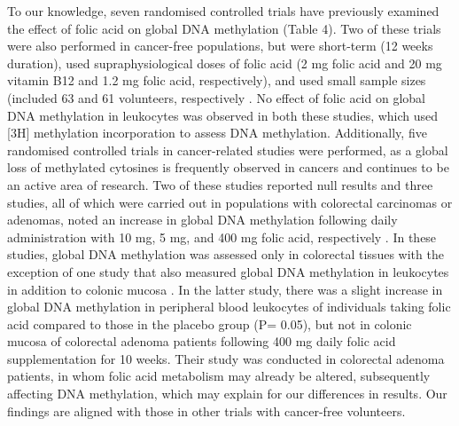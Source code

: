\noindent To our knowledge, seven randomised controlled trials have previously examined the effect of folic acid on global DNA methylation (Table 4). Two of these trials were also performed in cancer-free populations, but were short-term (12 weeks duration), used supraphysiological doses of folic acid (2 mg folic acid and 20 mg vitamin B12 and 1.2 mg folic acid, respectively), and used small sample sizes (included 63 and 61 volunteers, respectively \cite{c434,c435}. No effect of folic acid on global DNA methylation in leukocytes was observed in both these studies, which used [3H] methylation incorporation to assess DNA methylation. Additionally, five randomised controlled trials in cancer-related studies were performed, as a global loss of methylated cytosines is frequently observed in cancers \cite{c436} and continues to be an active area of research. Two of these studies reported null results \cite{c437,c438} and three studies, all of which were carried out in populations with colorectal carcinomas or adenomas, noted an increase in global DNA methylation following daily administration with 10 mg, 5 mg, and 400 mg folic acid, respectively \cite{c439,c441}. In these studies, global DNA methylation was assessed only in colorectal tissues with the exception of one study that also measured global DNA methylation in leukocytes in addition to colonic mucosa \cite{c441}. In the latter study, there was a slight increase in global DNA methylation in peripheral blood leukocytes of individuals taking folic acid compared to those in the placebo group (P= 0.05), but not in colonic mucosa of colorectal adenoma patients following 400 mg daily folic acid supplementation for 10 weeks. Their study was conducted in colorectal adenoma patients, in whom folic acid metabolism may already be altered, subsequently affecting DNA methylation, which may explain for our differences in results. Our findings are aligned with those in other trials with cancer-free volunteers.

